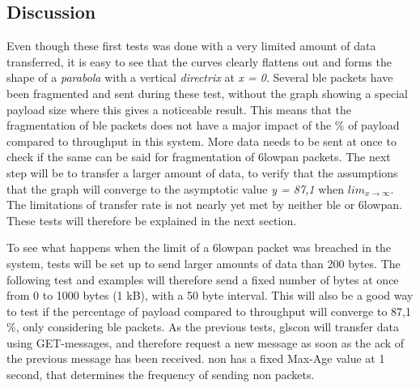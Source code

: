 \subsection{Discussion}

\noindent Even though these first tests was done with a very limited amount of data transferred, it is easy to see that the curves clearly flattens out and forms the shape of a \textit{parabola} with a vertical \textit{directrix} at \textit{x = 0}. Several \gls{ble} packets have been fragmented and sent during these test, without the graph showing a special \gls{payload} size where this gives a noticeable result. This means that the fragmentation of \gls{ble} packets does not have a major impact of the \% of payload compared to throughput in this system. More data needs to be sent at once to check if the same can be said for fragmentation of \gls{6lowpan} packets. The next step will be to transfer a larger amount of data, to verify that the assumptions that the graph will converge to the asymptotic value \textit{y = 87,1} when $lim_{x\to\infty}$. The limitations of transfer rate is not nearly yet met by neither \gls{ble} or \gls{6lowpan}.  These tests will therefore be explained in the next section. 



\noindent To see what happens when the limit of a \gls{6lowpan} packet was breached in the system, tests will be set up to send larger amounts of data than 200 bytes. The following test and examples will therefore send a fixed number of bytes at once from 0 to 1000 bytes (1 kB), with a 50 byte interval. This will also be a good way to test if the percentage of \gls{payload} compared to \gls{throughput} will converge to 87,1 \%, only considering \gls{ble} packets. As the previous tests, gls{con} will transfer data using GET-messages, and therefore request a new message as soon as the \gls{ack} of the previous message has been received. \gls{non} has a fixed Max-Age value at 1 second, that determines the frequency of sending \gls{non} packets. 


